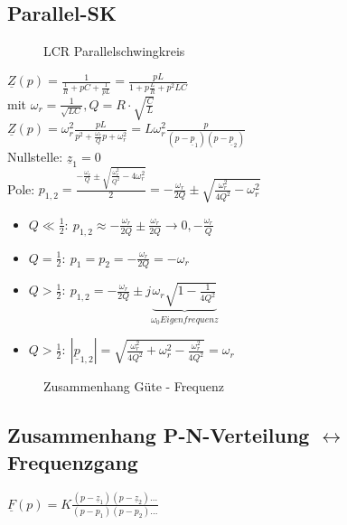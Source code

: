 \subsection{Parallel-SK}
\begin{figure}
	\centering
	
  \caption[LCR Parallelschwingkreis]{LCR Parallelschwingkreis}
  \label{fig:ElNetzw:LCRParallelschwingkreis}
\end{figure}
$\underline{Z}(p)=\frac{1}{\frac{1}{R}+pC+\frac{1}{pL}}=\frac{pL}{1+p\frac{L}{R}+p^2LC}$\\
mit $\omega_r=\frac{1}{\sqrt{LC}}, Q=R\cdot\sqrt{\frac{C}{L}}$\\
$\underline{Z}(p)=\omega_r^2\frac{pL}{p^2+\frac{\omega_r}{Q}p+\omega_r^2}=L\omega_r^2
\frac{p}{(p-\underline{p}_1)(p-\underline{p}_2)}$\\
Nullstelle: $\underline{z}_1=0$\\
Pole:
$p_{1,2}=\frac{-\frac{\omega_r}{Q}\pm\sqrt{\frac{\omega_r^2}{Q^2}-4\omega_r^2}}{2}=-\frac{\omega_r}{2Q}\pm\sqrt{\frac{\omega_r^2}{4Q^2}-\omega_r^2}$\\
\begin{itemize}
  \item $Q\ll\frac{1}{2}:\
  p_{1,2}\approx-\frac{\omega_r}{2Q}\pm\frac{\omega_r}{2Q}\rightarrow 0,
  -\frac{\omega_r}{Q}$
  \item $Q=\frac{1}{2}:\ p_1=p_2=-\frac{\omega_r}{2Q}=-\omega_r$
  \item $Q>\frac{1}{2}:\ p_{1,2}=-\frac{\omega_r}{2Q}\pm
  j\underbrace{\omega_r\sqrt{1-\frac{1}{4Q^2}}}_{\omega_0 Eigenfrequenz}$
  \item $Q>\frac{1}{2}:\ 
  |\underline{p}_{1,2}|=\sqrt{\frac{\omega_r^2}{4Q^2}+\omega_r^2-\frac{\omega_r^2}{4Q^2}}=\omega_r$
\end{itemize}

\begin{figure}[!ht]
\begin{center}
  
  \caption{Zusammenhang Güte - Frequenz}
  \label{fig:elNetzw:GueteFrequenz}
\end{center}
\end{figure}

\subsection{Zusammenhang P-N-Verteilung $\leftrightarrow$ Frequenzgang}
$\underline{F}(p)=K\frac{(p-\underline{z}_1)(p-\underline{z}_2)\ldots}{(p-p_1)(p-p_2)\ldots}$\\

